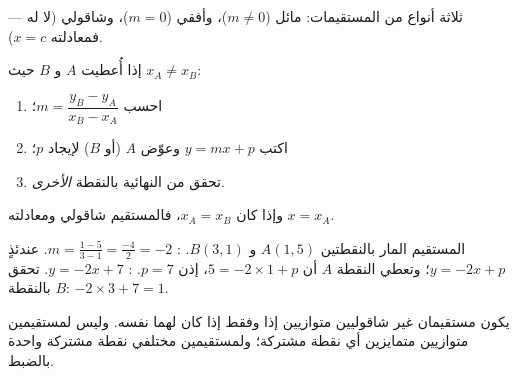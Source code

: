 \begin{omfigure}

{\small ثلاثة أنواع من المستقيمات: مائل ($m \neq 0$)، وأفقي ($m = 0$)،
وشاقولي (لا  له --- فمعادلته $x = c$).}
\end{omfigure}

\begin{method}\label{met:g10:lines:through}
إذا أُعطيت $A$ و $B$ حيث $x_A \neq x_B$:
\begin{enumerate}
  \item احسب  $m = \dfrac{y_B - y_A}{x_B - x_A}$؛
  \item اكتب $y = mx + p$ وعوّض  $A$ (أو $B$)
        لإيجاد $p$؛
  \item تحقق من  النهائية بالنقطة \emph{الأخرى}.
\end{enumerate}
وإذا كان $x_A = x_B$، فالمستقيم شاقولي ومعادلته $x = x_A$.
\end{method}

\begin{example}\label{ex:g10:lines:through}
المستقيم المار بالنقطتين $A(1, 5)$ و $B(3, 1)$. :
$m = \frac{1 - 5}{3 - 1} = \frac{-4}{2} = -2$. عندئذٍ $y = -2x + p$؛ وتعطي
النقطة $A$ أن $5 = -2 \times 1 + p$، إذن $p = 7$. :
$y = -2x + 7$. تحقق بالنقطة $B$: $-2 \times 3 + 7 = 1$.
\end{example}

\begin{proposition}\label{prop:g10:lines:parallel}
يكون مستقيمان غير شاقوليين متوازيين إذا وفقط إذا كان لهما 
نفسه. وليس لمستقيمين متوازيين متمايزين أي نقطة مشتركة؛ ولمستقيمين
مختلفي  نقطة مشتركة واحدة بالضبط.
\end{proposition}

